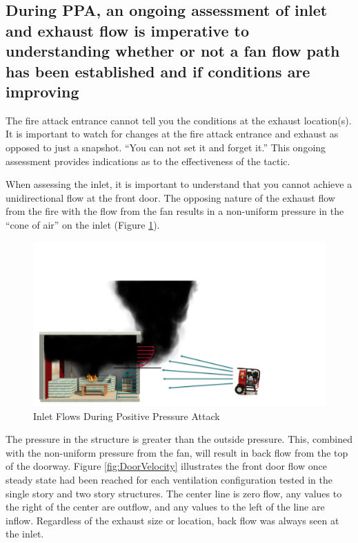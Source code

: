 \documentclass{article}
\begin{document}
\subsection{During PPA, an ongoing assessment of inlet and exhaust flow is imperative to understanding whether or not a fan flow path has been established and if conditions are improving} \label{sec:OngoingAssessment}
The fire attack entrance cannot tell you the conditions at the exhaust location(s). It is important to watch for changes at the fire attack entrance and exhaust as opposed to just a snapshot. ``You can not set it and forget it.'' This ongoing assessment provides indications as to the effectiveness of the tactic. 

When assessing the inlet, it is important to understand that you cannot achieve a unidirectional flow at the front door. The opposing nature of the exhaust flow from the fire with the flow from the fan results in a non-uniform pressure in the “cone of air” on the inlet (Figure \ref{fig:FanAndDoorFlow}).

\begin{figure}[H]
	\centering
	\includegraphics[width = 6in]{0_Images/Tactical_Considerations/Ongoing_Assessment/FanandDoorFlow.pdf}
	\caption{Inlet Flows During Positive Pressure Attack}
	\label{fig:FanAndDoorFlow}
\end{figure}

The pressure in the structure is greater than the outside pressure. This, combined with the non-uniform pressure from the fan, will result in back flow from the top of the doorway. Figure \ref{fig:DoorVelocity} illustrates the front door flow once steady state had been reached for each ventilation configuration tested in the single story and two story structures. The center line is zero flow, any values to the right of the center are outflow, and any values to the left of the line are inflow. Regardless of the exhaust size or location, back flow was always seen at the inlet.
\end{document}
